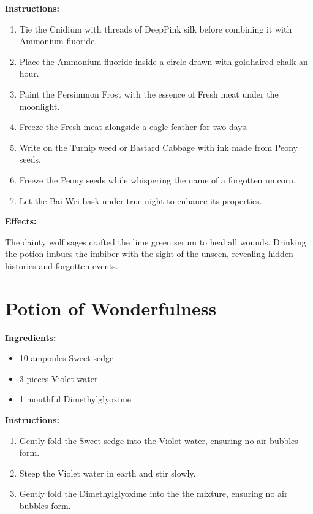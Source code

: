 \documentclass{article}
\begin{document}
\textbf{Instructions:}

\begin{enumerate}
  \item Tie the Cnidium with threads of DeepPink silk before combining it with Ammonium fluoride.
  \item Place the Ammonium fluoride inside a circle drawn with goldhaired chalk an hour.
  \item Paint the Persimmon Frost with the essence of Fresh meat under the moonlight.
  \item Freeze the Fresh meat alongside a eagle feather for two days.
  \item Write on the Turnip weed or Bastard Cabbage with ink made from Peony seeds.
  \item Freeze the Peony seeds while whispering the name of a forgotten unicorn.
  \item Let the Bai Wei bask under true night to enhance its properties.
\end{enumerate}

\textbf{Effects:}

The dainty wolf sages crafted the lime green serum to heal all wounds. Drinking the potion imbues the imbiber with the sight of the unseen, revealing hidden histories and forgotten events.

\newpage
\section*{Potion of Wonderfulness}

\textbf{Ingredients:}

\begin{itemize}
  \item 10 ampoules Sweet sedge
  \item 3 pieces Violet water
  \item 1 mouthful Dimethylglyoxime
\end{itemize}

\textbf{Instructions:}

\begin{enumerate}
  \item Gently fold the Sweet sedge into the Violet water, ensuring no air bubbles form.
  \item Steep the Violet water in earth and stir slowly.
  \item Gently fold the Dimethylglyoxime into the the mixture, ensuring no air bubbles form.
\end{enumerate}
\end{document}
